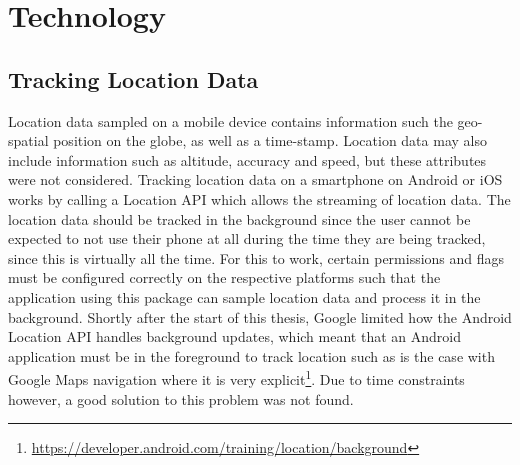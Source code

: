 \section{Technology}

\subsection{Tracking Location Data}
Location data sampled on a mobile device contains information such the geo-spatial position on the globe, as well as a time-stamp. Location data may also include information such as altitude, accuracy and speed, but these attributes were not considered. Tracking location data on a smartphone on Android or iOS works by calling a Location API which allows the streaming of location data. The location data should be tracked in the background since the user cannot be expected to not use their phone at all during the time they are being tracked, since this is virtually all the time. For this to work, certain permissions and flags must be configured correctly on the respective platforms such that the application using this package can sample location data and process it in the background. Shortly after the start of this thesis, Google limited how the Android Location API handles background updates, which meant that an Android application must be in the foreground to track location such as is the case with Google Maps navigation where it is very explicit\footnote{\url{https://developer.android.com/training/location/background}}. Due to time constraints however, a good solution to this problem was not found.

